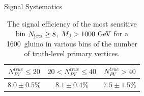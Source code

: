 \begin{section}{Signal Systematics}
\begin{table}[tbp!]
\centering
\begin{tabular}{ |c|c|c| }
\hline
$N_{PV}^{true} \leq 20$ & $20 < N_{PV}^{true} \leq 40$ & $N_{PV}^{true} > 40$ \\ \hline
$8.0 \pm 0.5\%$ & $8.1 \pm 0.4\%$ & $7.5 \pm 1.5\%$ \\ \hline
\end{tabular}
\caption{The signal efficiency of the most sensitive bin $N_{\mathrm{jets}} \geq 8$, $M_{\mathrm{J}} > 1000~\mathrm{Ge\kern -0.1em V}$ for a 1600~\GeV gluino in various bins of the number of truth-level primary vertices.}
\label{tab:sig_pu_dependence}
\end{table}

\end{section}
